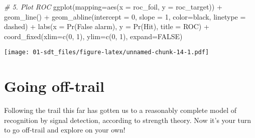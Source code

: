 \documentclass[
]{book}
\newenvironment{Shaded}{\begin{snugshade}}{\end{snugshade}}
\newcommand{\AttributeTok}[1]{\textcolor[rgb]{0.77,0.63,0.00}{#1}}
\newcommand{\CommentTok}[1]{\textcolor[rgb]{0.56,0.35,0.01}{\textit{#1}}}
\newcommand{\ConstantTok}[1]{\textcolor[rgb]{0.00,0.00,0.00}{#1}}
\newcommand{\DecValTok}[1]{\textcolor[rgb]{0.00,0.00,0.81}{#1}}
\newcommand{\FunctionTok}[1]{\textcolor[rgb]{0.00,0.00,0.00}{#1}}
\newcommand{\NormalTok}[1]{#1}
\newcommand{\SpecialCharTok}[1]{\textcolor[rgb]{0.00,0.00,0.00}{#1}}
\newcommand{\StringTok}[1]{\textcolor[rgb]{0.31,0.60,0.02}{#1}}
\begin{document}
\begin{Shaded}
\begin{Highlighting}[]
\CommentTok{\# 5. Plot ROC}
\FunctionTok{ggplot}\NormalTok{(}\AttributeTok{mapping=}\FunctionTok{aes}\NormalTok{(}\AttributeTok{x =}\NormalTok{ roc\_foil, }\AttributeTok{y =}\NormalTok{ roc\_target)) }\SpecialCharTok{+}
    \FunctionTok{geom\_line}\NormalTok{() }\SpecialCharTok{+}
    \FunctionTok{geom\_abline}\NormalTok{(}\AttributeTok{intercept =} \DecValTok{0}\NormalTok{, }\AttributeTok{slope =} \DecValTok{1}\NormalTok{, }\AttributeTok{color=}\StringTok{\textquotesingle{}black\textquotesingle{}}\NormalTok{, }\AttributeTok{linetype =} \StringTok{\textquotesingle{}dashed\textquotesingle{}}\NormalTok{) }\SpecialCharTok{+}
    \FunctionTok{labs}\NormalTok{(}\AttributeTok{x =} \StringTok{\textquotesingle{}Pr(False alarm)\textquotesingle{}}\NormalTok{, }\AttributeTok{y =} \StringTok{\textquotesingle{}Pr(Hit)\textquotesingle{}}\NormalTok{, }\AttributeTok{title =} \StringTok{\textquotesingle{}ROC\textquotesingle{}}\NormalTok{) }\SpecialCharTok{+}
    \FunctionTok{coord\_fixed}\NormalTok{(}\AttributeTok{xlim=}\FunctionTok{c}\NormalTok{(}\DecValTok{0}\NormalTok{, }\DecValTok{1}\NormalTok{), }\AttributeTok{ylim=}\FunctionTok{c}\NormalTok{(}\DecValTok{0}\NormalTok{, }\DecValTok{1}\NormalTok{), }\AttributeTok{expand=}\ConstantTok{FALSE}\NormalTok{)}
\end{Highlighting}
\end{Shaded}

\texttt{[image: 01-sdt\_files/figure-latex/unnamed-chunk-14-1.pdf]}

\hypertarget{going-off-trail}{%
\section{Going off-trail}\label{going-off-trail}}

Following the trail this far has gotten us to a reasonably complete model of recognition by signal detection, according to strength theory. Now it's your turn to go off-trail and explore on your own!
\end{document}
